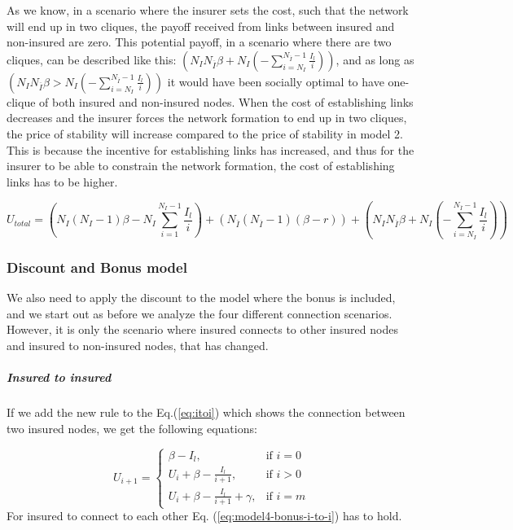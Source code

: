 As we know, in a scenario where the insurer sets the cost, such that the network will end up in two cliques, the payoff received from links between insured and non-insured are zero. This potential payoff, in a scenario where there are two cliques, can be described like this: $(N_{I}N_{\overline{I}}\beta+N_{I}(-\sum_{i=N_{I}}^{N_{\overline{I}}-1}\frac{I_{l}}{i}))$, and as long as $(N_{I}N_{\overline{I}}\beta>N_{I}(-\sum_{i=N_{I}}^{N_{\overline{I}}-1}\frac{I_{l}}{i}))$ it would have been socially optimal to have one-clique of both insured and non-insured nodes.
When the cost of establishing links decreases and the insurer forces the network formation to end up in two cliques, the price of stability will increase compared to the price of stability in model 2. 
This is because the incentive for establishing links has increased, and thus for the insurer to be able to constrain the network formation, the cost of establishing links has to be higher.

\begin{equation}
U_{total}=(N_{I}(N_{I}-1)\beta-N_{I} \sum_{i=1}^{N_{I}-1} \frac{I_{l}}{i})+(N_{\overline{I}}(N_{\overline{I}}-1)(\beta-r))+(N_{I}N_{\overline{I}}\beta+N_{I}(-\sum_{i=N_{I}}^{N_{\overline{I}}-1}\frac{I_{l}}{i}))
\label{eq:model4-discount-total-payoff}
\end{equation}

\subsubsection{Discount and Bonus model}
We also need to apply the discount to the model where the bonus is included, and we start out as before we analyze the four different connection scenarios. However, it is only the scenario where insured connects to other insured nodes and insured to non-insured nodes, that has changed.
\subparagraph{Insured to insured}

If we add the new rule to the Eq.(\ref{eq:itoi}) which shows the connection between two insured nodes, we get the following equations: 

\begin{equation}
    U_{i+1}= 
\begin{cases}
    \beta - I_{l},& \text{if } i = 0\\
    U_{i}+\beta -\frac{I_{l}}{i+1},& \text{if }  i>0\\
    U_{i}+\beta -\frac{I_{l}}{i+1}+\gamma,& \text{if } i=m
\end{cases}
\label{eq:discount1}
\end{equation}
For insured to connect to each other Eq. (\ref{eq:model4-bonus-i-to-i}) has to hold.


